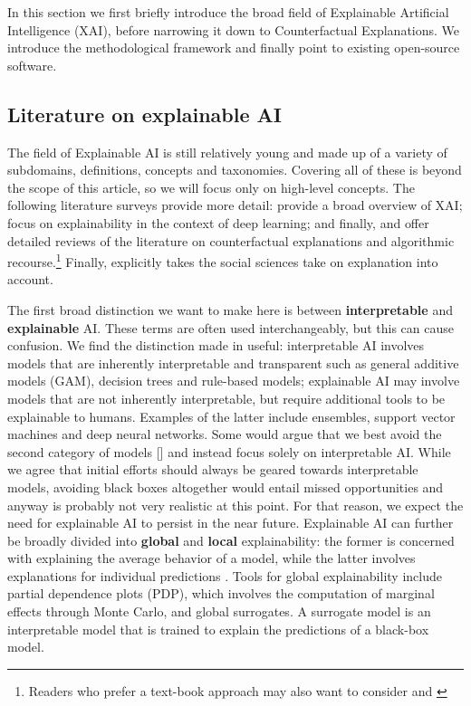 \documentclass[
  letterpaper,
  DIV=11,
  numbers=noendperiod]{scrartcl}
\begin{document}
In this section we first briefly introduce the broad field of
Explainable Artificial Intelligence (XAI), before narrowing it down to
Counterfactual Explanations. We introduce the methodological framework
and finally point to existing open-source software.

\hypertarget{literature-on-explainable-ai}{%
\subsection{Literature on explainable
AI}\label{literature-on-explainable-ai}}

The field of Explainable AI is still relatively young and made up of a
variety of subdomains, definitions, concepts and taxonomies. Covering
all of these is beyond the scope of this article, so we will focus only
on high-level concepts. The following literature surveys provide more
detail: \cite{arrieta2020explainable} provide a broad overview of XAI;
\cite{fan2020interpretability} focus on explainability in the context of
deep learning; and finally, \cite{karimi2020survey} and
\cite{verma2020counterfactual} offer detailed reviews of the literature
on counterfactual explanations and algorithmic recourse.\footnote{Readers
  who prefer a text-book approach may also want to consider
  \cite{molnar2020interpretable} and \cite{varshney2022trustworthy}}
Finally, \cite{miller2019explanation} explicitly takes the social
sciences take on explanation into account.

The first broad distinction we want to make here is between
\textbf{interpretable} and \textbf{explainable} AI. These terms are
often used interchangeably, but this can cause confusion. We find the
distinction made in \cite{rudin2019stop} useful: interpretable AI
involves models that are inherently interpretable and transparent such
as general additive models (GAM), decision trees and rule-based models;
explainable AI may involve models that are not inherently interpretable,
but require additional tools to be explainable to humans. Examples of
the latter include ensembles, support vector machines and deep neural
networks. Some would argue that we best avoid the second category of
models {[}\cite{rudin2019stop}{]} and instead focus solely on
interpretable AI. While we agree that initial efforts should always be
geared towards interpretable models, avoiding black boxes altogether
would entail missed opportunities and anyway is probably not very
realistic at this point. For that reason, we expect the need for
explainable AI to persist in the near future. Explainable AI can further
be broadly divided into \textbf{global} and \textbf{local}
explainability: the former is concerned with explaining the average
behavior of a model, while the latter involves explanations for
individual predictions \cite{molnar2020interpretable}. Tools for global
explainability include partial dependence plots (PDP), which involves
the computation of marginal effects through Monte Carlo, and global
surrogates. A surrogate model is an interpretable model that is trained
to explain the predictions of a black-box model.
\end{document}
